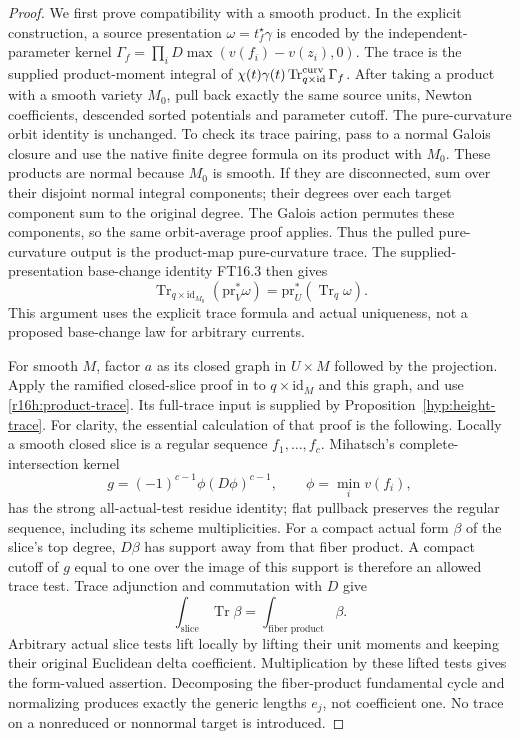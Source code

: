 \documentclass[11pt,a4paper]{article}
\theoremstyle{definition}
\theoremstyle{remark}
\numberwithin{equation}{section}
\begin{document}
\begin{proof}
We first prove compatibility with a smooth product. In the explicit
construction, a source presentation $\omega=t_f^\star\gamma$ is encoded by
the independent-parameter kernel
$\Gamma_f=\prod_iD\max(v(f_i)-v(z_i),0)$. The trace is the supplied
product-moment integral of
$\chi(t)\gamma(t)\operatorname{Tr}^{\rm curv}_{q\times\mathrm{id}}\Gamma_f$.
After taking a product with a smooth variety $M_0$, pull back exactly the
same source units, Newton coefficients, descended sorted potentials and
parameter cutoff. The pure-curvature orbit identity is unchanged.
To check its trace pairing, pass to a normal Galois closure and use the
native finite degree formula on its product with $M_0$. These products
are normal because $M_0$ is smooth. If they are disconnected, sum over
their disjoint normal integral components; their degrees over each
target component sum to the original degree. The Galois action permutes
these components, so the same orbit-average proof applies. Thus the
pulled pure-curvature output is the product-map pure-curvature trace.
The supplied-presentation base-change identity FT16.3 then gives
\[
 \operatorname{Tr}_{q\times\mathrm{id}_{M_0}}(\mathrm{pr}_V^*\omega)
             =\mathrm{pr}_U^*(\operatorname{Tr}_q\omega).
 \tag{H16.2}\label{r16h:product-trace}
\]
This argument uses the explicit trace formula and actual uniqueness,
not a proposed base-change law for arbitrary currents.

For smooth $M$, factor $a$ as its closed graph in $U\times M$ followed
by the projection. Apply the ramified closed-slice proof in
\cite[Theorem G10.T2]{Ram10} to $q\times\mathrm{id}_M$ and this graph, and use
\eqref{r16h:product-trace}. Its full-trace input is supplied by Proposition~\ref{hyp:height-trace}. For clarity, the essential calculation of that
proof is the following. Locally a smooth closed slice is a regular
sequence $f_1,\ldots,f_c$. Mihatsch's complete-intersection kernel
\[
 g=(-1)^{c-1}\phi(D\phi)^{c-1},\qquad \phi=\min_i v(f_i),
\]
has the strong all-actual-test residue identity; flat pullback preserves
the regular sequence, including its scheme multiplicities. For a compact
actual form $\beta$ of the slice's top degree, $D\beta$ has support away
from that fiber product. A compact cutoff of $g$ equal to one over the
image of this support is therefore an allowed trace test. Trace
adjunction and commutation with $D$ give
\[
 \int_{\text{slice}}\operatorname{Tr}\beta
                   =\int_{\text{fiber product}}\beta.
\]
Arbitrary actual slice tests lift locally by lifting their unit moments
and keeping their original Euclidean delta coefficient. Multiplication
by these lifted tests gives the form-valued assertion. Decomposing the
fiber-product fundamental cycle and normalizing produces exactly the
generic lengths $e_j$, not coefficient one. No trace on a nonreduced
or nonnormal target is introduced.


\end{proof}
\end{document}
